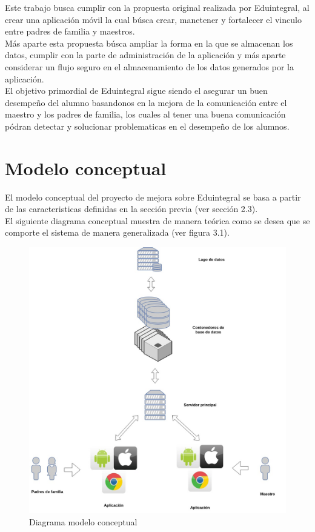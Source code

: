 
Este trabajo busca cumplir con la propuesta original realizada por Eduintegral, al crear una aplicación móvil la cual búsca crear, manetener y fortalecer el vinculo entre padres de familia y maestros. \\ Más aparte esta propuesta búsca ampliar la forma en la que se almacenan los datos, cumplir con la parte de administración de la aplicación y más aparte considerar un flujo seguro en el almacenamiento de los datos generados por la aplicación. \\ El objetivo primordial de Eduintegral sigue siendo el asegurar un buen desempeño del alumno basandonos en la mejora de la comunicación entre el maestro y los padres de familia, los cuales al tener una buena comunicación pódran detectar y solucionar problematicas en el desempeño de los alumnos.

\section{Modelo conceptual}
    
    El modelo conceptual del proyecto de mejora sobre Eduintegral se basa a partir de las caracteristicas definidas en la sección previa (ver sección 2.3). \\ El siguiente diagrama conceptual muestra de manera teórica como se desea que se comporte el sistema de manera generalizada (ver figura 3.1).
    
    \begin{figure}[H]
        \centering
        \includegraphics[scale=0.3]{imagenes/arquitectura_propuesta.jpg}
        \caption{Diagrama modelo conceptual}
        \label{fig:diagramamodeloconceptual}
    \end{figure}
    
